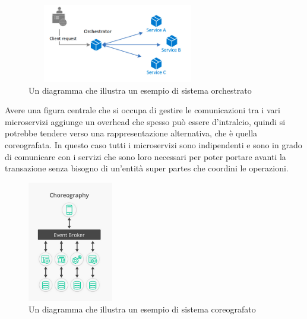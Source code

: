 \begin{figure}[h]
    \centering
    \includegraphics[width=300px, height=130px]{./images/orchestration.png}
    \caption{Un diagramma che illustra un esempio di sistema orchestrato}
    \label{fig:orchestration}
\end{figure}

Avere una figura centrale che si occupa di gestire le comunicazioni tra i vari microservizi aggiunge un overhead che spesso può essere d'intralcio, quindi si potrebbe tendere verso una rappresentazione alternativa, che è quella coreografata. In questo caso tutti i microservizi sono indipendenti e sono in grado di comunicare con i servizi che sono loro necessari per poter portare avanti la transazione senza bisogno di un'entità super partes che coordini le operazioni.

\begin{figure}[h]
    \centering
    \includegraphics[height=200px]{./images/choreography.png}
    \caption{Un diagramma che illustra un esempio di sistema coreografato}
    \label{fig:coreography}
\end{figure}

